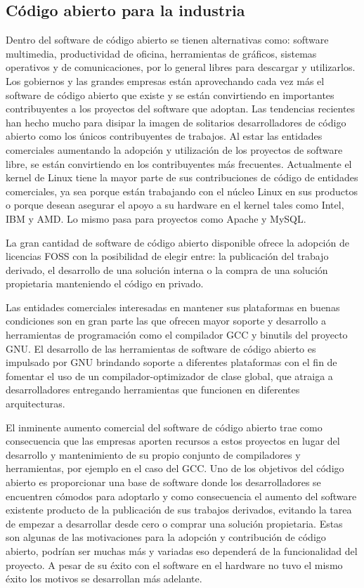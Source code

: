 	\subsection{Código abierto para la industria}

	Dentro del software de código abierto se tienen alternativas como: software multimedia, productividad de oficina, herramientas de
	gráficos, sistemas operativos y de comunicaciones, por lo general libres para descargar y utilizarlos. Los gobiernos y las grandes empresas están
	aprovechando cada vez más el software de código abierto que existe y se están convirtiendo en importantes contribuyentes a los proyectos del
	software que adoptan. Las tendencias recientes han hecho mucho para disipar la imagen de solitarios desarrolladores de código abierto como los
	únicos contribuyentes de trabajos. Al estar las entidades comerciales aumentando la adopción y utilización de los proyectos de software libre,  se
	están convirtiendo en los contribuyentes más frecuentes. Actualmente el kernel de Linux tiene la mayor parte de sus contribuciones de código de
	entidades comerciales, ya sea porque están trabajando con el núcleo Linux en sus productos o porque desean asegurar el apoyo a su hardware en el
	kernel tales como Intel,  IBM y AMD. Lo mismo pasa para proyectos como Apache y MySQL.

	La gran cantidad de software de código abierto disponible ofrece la adopción de licencias FOSS con la posibilidad de elegir entre: la publicación del
	trabajo derivado, el desarrollo de una solución interna o la compra de una solución propietaria manteniendo el código en privado.

 	Las entidades comerciales interesadas en mantener sus plataformas en buenas condiciones son en gran parte las que ofrecen mayor soporte y desarrollo
 	a herramientas de programación como el compilador GCC y binutils del proyecto GNU. El desarrollo de las herramientas de software de código abierto
 	es impulsado por GNU brindando soporte a diferentes plataformas con el fin de fomentar el uso de un compilador-optimizador de clase global, que
 	atraiga a desarrolladores entregando herramientas que funcionen en diferentes arquitecturas.

	El inminente aumento comercial del software de código abierto trae como consecuencia que las empresas aporten recursos a estos proyectos en lugar del
	desarrollo y mantenimiento de su propio conjunto de compiladores y herramientas, por ejemplo en el caso del GCC. Uno de los objetivos del código
	abierto es proporcionar una base de software donde los desarrolladores se encuentren cómodos para adoptarlo y como consecuencia el aumento del
	software existente producto de la publicación de sus trabajos derivados, evitando la tarea de empezar a desarrollar desde cero o comprar una solución
	propietaria. Estas son algunas de las motivaciones para la adopción y contribución de código abierto, podrían ser muchas más y variadas eso dependerá
	de la funcionalidad del proyecto. A pesar de su éxito con el software en el hardware no tuvo el mismo éxito los motivos se desarrollan más adelante.

